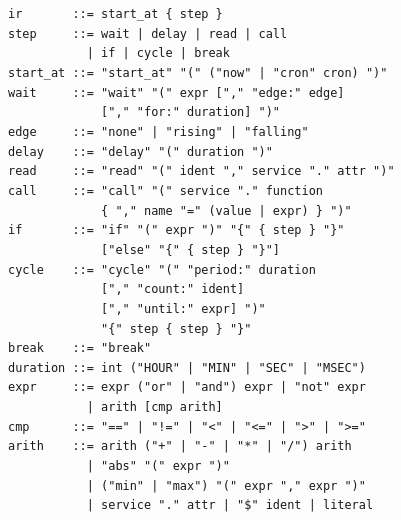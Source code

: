 \documentclass[sigconf,nonacm,anonymous,review]{acmart}
\begin{document}
{\small
\begin{flushleft}
\texttt{ir \ \ \ \ \ \ ::= start\_at \{ step \}}\\
\texttt{step \ \ \ \ ::= wait | delay | read | call}\\
\texttt{\ \ \ \ \ \ \ \ \ \ \ | if | cycle | break}\\[3pt]
\texttt{start\_at ::= "start\_at" "(" ("now" | "cron" cron) ")"}\\
\texttt{wait \ \ \ \ ::= "wait" "(" expr ["," "edge:" edge]}\\
\texttt{\ \ \ \ \ \ \ \ \ \ \ \ \ ["," "for:" duration] ")"}\\
\texttt{edge \ \ \ \ ::= "none" | "rising" | "falling"}\\
\texttt{delay \ \ \ ::= "delay" "(" duration ")"}\\
\texttt{read \ \ \ \ ::= "read" "(" ident "," service "." attr ")"}\\
\texttt{call \ \ \ \ ::= "call" "(" service "." function}\\
\texttt{\ \ \ \ \ \ \ \ \ \ \ \ \ \{ "," name "=" (value | expr) \} ")"}\\
\texttt{if \ \ \ \ \ \ ::= "if" "(" expr ")" "\{" \{ step \} "\}"}\\
\texttt{\ \ \ \ \ \ \ \ \ \ \ \ \ ["else" "\{" \{ step \} "\}"]}\\
\texttt{cycle \ \ \ ::= "cycle" "(" "period:" duration}\\
\texttt{\ \ \ \ \ \ \ \ \ \ \ \ \ ["," "count:" ident]}\\
\texttt{\ \ \ \ \ \ \ \ \ \ \ \ \ ["," "until:" expr] ")"}\\
\texttt{\ \ \ \ \ \ \ \ \ \ \ \ \ "\{" step \{ step \} "\}"}\\
\texttt{break \ \ \ ::= "break"}\\[3pt]
\texttt{duration ::= int ("HOUR" | "MIN" | "SEC" | "MSEC")}\\[3pt]
\texttt{expr \ \ \ \ ::= expr ("or" | "and") expr | "not" expr}\\
\texttt{\ \ \ \ \ \ \ \ \ \ \ | arith [cmp arith]}\\
\texttt{cmp \ \ \ \ \ ::= "==" | "!=" | "<" | "<=" | ">" | ">="}\\
\texttt{arith \ \ \ ::= arith ("+" | "-" | "*" | "/") arith}\\
\texttt{\ \ \ \ \ \ \ \ \ \ \ | "abs" "(" expr ")"}\\
\texttt{\ \ \ \ \ \ \ \ \ \ \ | ("min" | "max") "(" expr "," expr ")"}\\
\texttt{\ \ \ \ \ \ \ \ \ \ \ | service "." attr | "\$" ident | literal}
\end{flushleft}
}
\end{document}
